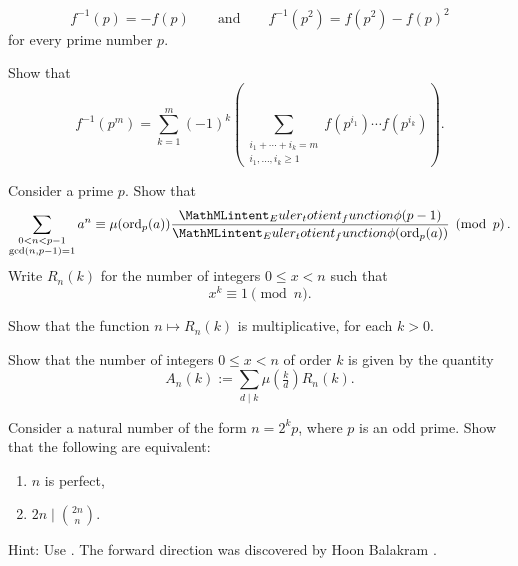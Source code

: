 \begin{routine}
\begin{subexenum}
    \begin{equation*}
      f^{-1}(p)=-f(p)\qquad\text{and}\qquad f^{-1}(p^2)=f(p^2)-f(p)^2
    \end{equation*}
    for every prime number $p$.
  \item Show that
    \begin{equation*}
      f^{-1}(p^m) = \sum_{k=1}^m (-1)^k\left(\sum_{\substack{i_1+\cdots +i_k=m\\ i_1,\ldots,i_k\geq 1}}f(p^{i_1})\cdots f(p^{i_k})\right).
    \end{equation*}
  \end{subexenum}
  \exercise Consider a prime $p$. Show that
  \begin{equation*}
    \sum_{\substack{0<n<p-1\\\gcd(n,p-1)=1}}a^n\equiv\mu(\ord_p(a))\frac{\totient(p-1)}{\totient(\ord_p(a))}\pmod{p}.
  \end{equation*}
  \exercise Write $R_n(k)$ for the number of integers $0\leq x<n$ such that
  \begin{equation*}
    x^k\equiv 1\pmod{n}.
  \end{equation*}
  \begin{subexenum}
  \item Show that the function $n\mapsto R_n(k)$ is multiplicative, for each $k>0$.
  \item Show that the number of integers $0\leq x<n$ of order $k$ is given by the quantity
    \begin{equation*}
      A_n(k):=\sum_{d\mid k}\mu\left(\tfrac{k}{d}\right)R_n(k).
    \end{equation*}
  \end{subexenum}
  \exercise Consider a natural number of the form $n=2^kp$, where $p$ is an odd prime. Show that the following are equivalent:
  \begin{enumerate}
  \item $n$ is perfect,
  \item $2n\mid\binom{2n}{n}$.
  \end{enumerate}
  Hint: Use . The forward direction was discovered by Hoon Balakram \cite{balakram1929}.
\end{routine}

